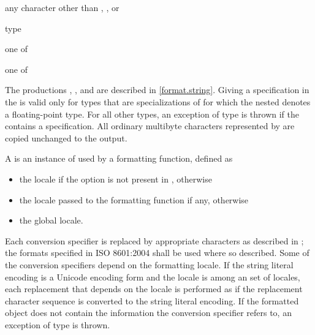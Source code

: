 \begin{ncbnf}
\br
    \textnormal{any character other than \tcode{\{}, \tcode{\}}, or \tcode{\%}}
\end{ncbnf}

\begin{ncbnf}
\br
    \terminal{\%}  type
\end{ncbnf}

\begin{ncbnf}
 \textnormal{one of}\br
\end{ncbnf}

\begin{ncbnf}
 \textnormal{one of}\br
    \br
\end{ncbnf}

The productions
,
, and
are described in \ref{format.string}.
Giving a  specification
in the 
is valid only for types that are
specializations of 
for which the nested   denotes
a floating-point type.
For all other types,
an exception of type  is thrown
if the 
contains a  specification.
All ordinary multibyte characters
represented by 
are copied unchanged to the output.

\pnum
A  is an instance of 
used by a formatting function, defined as
\begin{itemize}
\item
the  locale if the  option
is not present in , otherwise
\item
the locale passed to the formatting function if any, otherwise
\item
the global locale.
\end{itemize}

\pnum
Each conversion specifier 
is replaced by appropriate characters
as described in ;
the formats specified in ISO 8601:2004 shall be used where so described.
Some of the conversion specifiers
depend on the formatting locale.
If the string literal encoding is a Unicode encoding form and
the locale is among
an  set of locales,
each replacement that depends on the locale is performed as if
the replacement character sequence is converted to the string literal encoding.
If the formatted object does not contain the information
the conversion specifier refers to,
an exception of type  is thrown.

